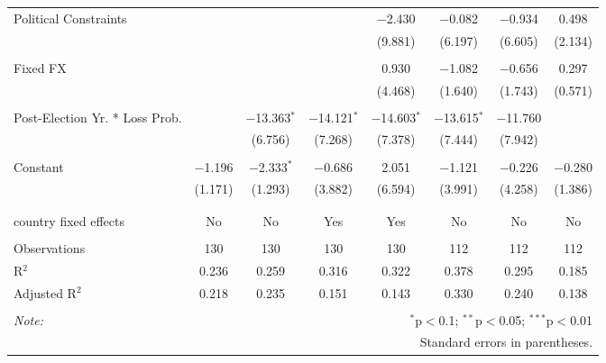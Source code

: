 \begin{tabular}{@{\extracolsep{5pt}}lccccccc}
 Political Constraints &  &  &  & $-$2.430 & $-$0.082 & $-$0.934 & 0.498 \\ 
  &  &  &  & (9.881) & (6.197) & (6.605) & (2.134) \\ 
  & & & & & & & \\ 
 Fixed FX &  &  &  & 0.930 & $-$1.082 & $-$0.656 & 0.297 \\ 
  &  &  &  & (4.468) & (1.640) & (1.743) & (0.571) \\ 
  & & & & & & & \\ 
 Post-Election Yr. * Loss Prob. &  & $-$13.363$^{*}$ & $-$14.121$^{*}$ & $-$14.603$^{*}$ & $-$13.615$^{*}$ & $-$11.760 &  \\ 
  &  & (6.756) & (7.268) & (7.378) & (7.444) & (7.942) &  \\ 
  & & & & & & & \\ 
 Constant & $-$1.196 & $-$2.333$^{*}$ & $-$0.686 & 2.051 & $-$1.121 & $-$0.226 & $-$0.280 \\ 
  & (1.171) & (1.293) & (3.882) & (6.594) & (3.991) & (4.258) & (1.386) \\ 
  & & & & & & & \\ 
\hline \\[-1.8ex] 
country fixed effects & No & No & Yes & Yes & No & No & No \\ 
\hline \\[-1.8ex] 
Observations & 130 & 130 & 130 & 130 & 112 & 112 & 112 \\ 
R$^{2}$ & 0.236 & 0.259 & 0.316 & 0.322 & 0.378 & 0.295 & 0.185 \\ 
Adjusted R$^{2}$ & 0.218 & 0.235 & 0.151 & 0.143 & 0.330 & 0.240 & 0.138 \\ 
\hline 
\hline \\[-1.8ex] 
\textit{Note:}  & \multicolumn{7}{r}{$^{*}$p$<$0.1; $^{**}$p$<$0.05; $^{***}$p$<$0.01} \\ 
 & \multicolumn{7}{r}{Standard errors in parentheses.} \\ 
\end{tabular} 
\endgroup 
